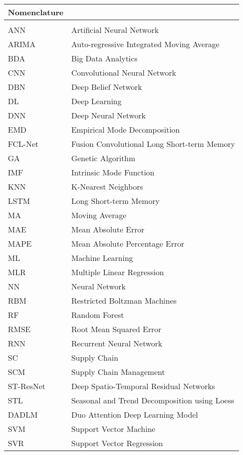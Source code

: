 \begin{tabular}{ ll } 
 Nomenclature & \\
 \hline\hline
 \rule{0pt}{2.6ex}\\
ANN & Artificial Neural Network \\
ARIMA & Auto-regressive Integrated Moving Average\\
BDA & Big Data Analytics\\
CNN & Convolutional Neural Network\\
DBN & Deep Belief Network\\
DL & Deep Learning\\
DNN & Deep Neural Network\\
EMD & Empirical Mode Decomposition \\
FCL-Net & Fusion Convolutional Long Short-term Memory\\
GA & Genetic Algorithm \\
IMF & Intrinsic Mode Function \\
KNN & K-Nearest Neighbors\\
LSTM & Long Short-term Memory\\
MA & Moving Average\\
MAE & Mean Absolute Error\\
MAPE & Mean Absolute Percentage Error \\
ML & Machine Learning\\
MLR & Multiple Linear Regression \\
NN & Neural Network\\
RBM & Restricted Boltzman Machines \\
RF & Random Forest\\
RMSE & Root Mean Squared Error\\
RNN & Recurrent Neural Network\\
SC & Supply Chain \\
SCM & Supply Chain Management\\
ST-ResNet & Deep Spatio-Temporal Residual Networks \\
STL & Seasonal and Trend Decomposition using Loess \\
DADLM & Duo Attention Deep Learning Model \\ 
SVM & Support Vector Machine\\
SVR & Support Vector Regression \\
\end{tabular}
